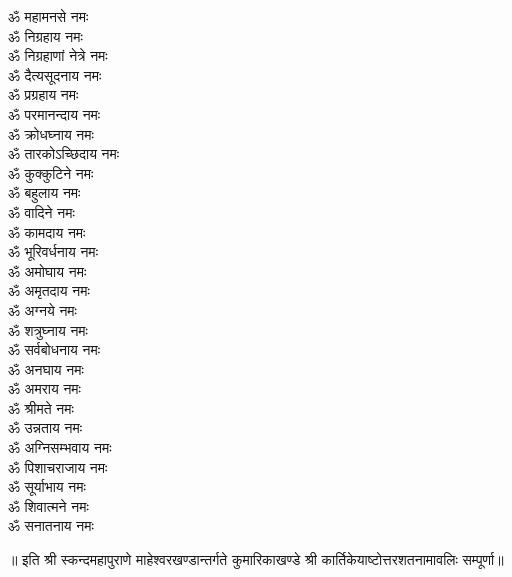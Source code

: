 \begin{multicols}{2}
\begin{flushleft}
ॐ महामनसे नमः\\
ॐ निग्रहाय नमः\\
ॐ निग्रहाणां नेत्रे नमः\\
ॐ दैत्यसूदनाय नमः\\
ॐ प्रग्रहाय नमः\\
ॐ परमानन्दाय नमः\\
ॐ क्रोधघ्नाय नमः\\
ॐ तारकोऽच्छिदाय नमः\\
ॐ कुक्कुटिने नमः\hfill{}\\
ॐ बहुलाय नमः\\
ॐ वादिने नमः\\
ॐ कामदाय नमः\\
ॐ भूरिवर्धनाय नमः\\
ॐ अमोघाय नमः\\
ॐ अमृतदाय नमः\\
ॐ अग्नये नमः\\
ॐ शत्रुघ्नाय नमः\\
ॐ सर्वबोधनाय नमः\\
ॐ अनघाय नमः\hfill{}\\
ॐ अमराय नमः\\
ॐ श्रीमते नमः\\
ॐ उन्नताय नमः\\
ॐ अग्निसम्भवाय नमः\\
ॐ पिशाचराजाय नमः\\
ॐ सूर्याभाय नमः\\
ॐ शिवात्मने नमः\\
ॐ सनातनाय नमः\\
\end{flushleft}
\end{multicols}
॥ इति श्री स्कन्दमहापुराणे माहेश्वरखण्डान्तर्गते कुमारिकाखण्डे श्री कार्तिकेयाष्टोत्तरशतनामावलिः सम्पूर्णा॥
